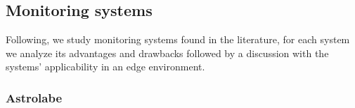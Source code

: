 





\subsection{Monitoring systems}

Following, we study monitoring systems found in the literature, for each system we analyze its advantages and drawbacks followed by a discussion with the systems' applicability in an edge environment.

\subsubsection{Astrolabe}

